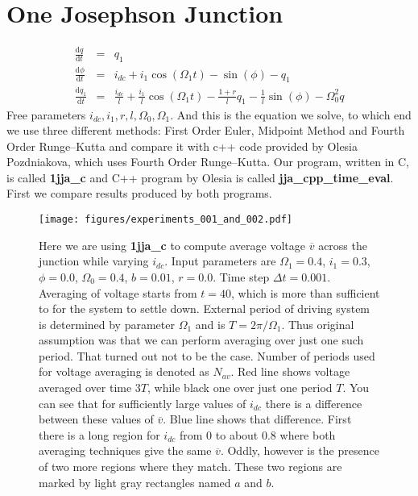 \documentclass[40pt,letterpaper]{article}
\begin{document}
  	\section{One Josephson Junction}
  	\begin{eqnarray}
  	\frac{\text{d}q}{\text{d}t} &=& q_1 \\
  	\frac{\text{d}\phi}{\text{d}t} &=& i_{dc} 
  		+ i_1 \cos(\Omega_{1}t) - \sin(\phi) 
  		- q_1 \\
  	\frac{\text{d}q_1}{\text{d}t} &=&
	\frac{i_{dc}}{l} + 
	\frac{i_1}{l}\cos(\Omega_1 t) 
	- \frac{1 + r}{l}q_1 - \frac{1}{l}\sin(\phi) 
	- \Omega_0^2 q
  	\end{eqnarray}
  	Free parameters $i_{dc}, i_1, r, l, \Omega_0, \Omega_1$. And this is the equation we solve, to which end we use 
  	three different methods: First Order Euler, Midpoint Method and Fourth Order Runge–Kutta and compare 
	it with c++ code provided by Olesia Pozdniakova, which uses Fourth Order Runge–Kutta. Our program, written in 
	C, is called \textbf{1jja\_c} and C++ program by Olesia is called \textbf{jja\_cpp\_time\_eval}.
	First we compare results produced by both programs. 
	\begin{figure}[h]
	\texttt{[image: figures/experiments\_001\_and\_002.pdf]}
	\caption{Here we are using \textbf{1jja\_c} to compute average voltage $\overline{v}$ across the junction while varying $i_{dc}$. Input parameters are $\Omega_{1}=0.4$, 
	$i_1=0.3$, 
	$\phi=0.0$, $\Omega_{0}=0.4$, $b=0.01$, $r=0.0$. Time step $\Delta t=0.001$. Averaging of voltage starts from $t=40$, which is more than sufficient to for the system to settle 
	down. External period of driving system is determined by parameter $\Omega_1$ and is $T=2\pi/\Omega_1$. Thus original assumption was that we can perform averaging 
	over just one such period. That turned out not to be the case. Number of periods used for voltage averaging is denoted as $N_{av}$. Red line shows voltage averaged 
	over time $3T$, while black one over just one period $T$. You can see that for sufficiently large values of $i_{dc}$ there is a difference between these values 
	of $\overline{v}$. Blue line shows that difference. First there is a long region for $i_{dc}$ from $0$ to about $0.8$ where both averaging techniques give the same 
	$\overline{v}$. Oddly, however is the presence of two more regions where they match. These two regions are marked by light gray rectangles named $a$ and $b$.}
	\end{figure}
\end{document}
